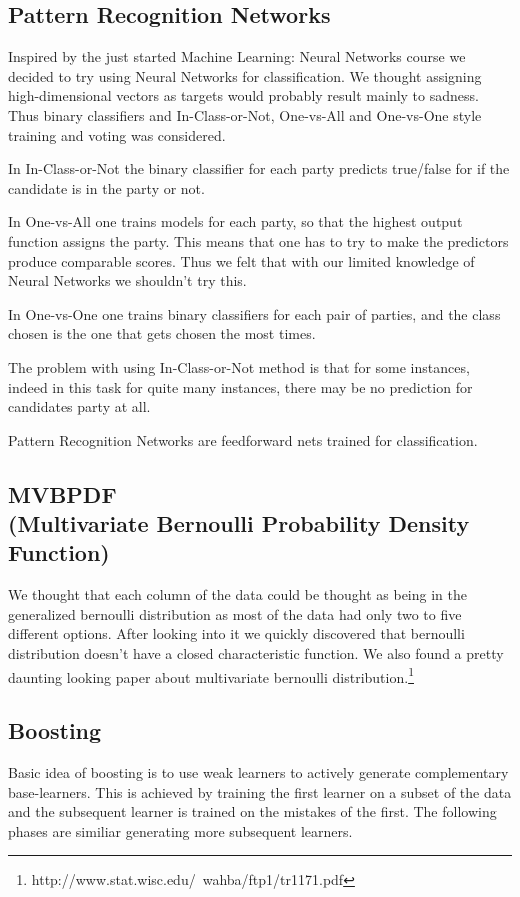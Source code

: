 \documentclass[a4paper,10pt]{article}
\begin{document}
\subsection{Pattern Recognition Networks}
Inspired by the just started Machine Learning: Neural Networks course we decided to try using Neural Networks for classification. We thought assigning high-dimensional vectors as targets would probably result mainly to sadness. Thus binary classifiers and In-Class-or-Not, One-vs-All and One-vs-One style training and voting was considered.


In In-Class-or-Not the binary classifier for each party predicts true/false for if the candidate is in the party or not.

In One-vs-All one trains models for each party, so that the highest output function assigns the party. This means that one has to try to make the predictors produce comparable scores. Thus we felt that with our limited knowledge of Neural Networks we shouldn’t try this.

In One-vs-One one trains binary classifiers for each pair of parties, and the class chosen is the one that gets chosen the most times.


The problem with using In-Class-or-Not method is that for some instances, indeed in this task for quite many instances, there may be no prediction for candidates party at all.

Pattern Recognition Networks are feedforward nets trained for classification.

\subsection{MVBPDF\\ {\small (Multivariate Bernoulli Probability Density Function)}}
We thought that each column of the data could be thought as being in the generalized bernoulli distribution as most of the data had only two to five different options. After looking into it we quickly discovered that bernoulli distribution doesn’t have a closed characteristic function. We also found a pretty daunting looking paper about multivariate bernoulli distribution.\footnote{http://www.stat.wisc.edu/~wahba/ftp1/tr1171.pdf}

\subsection{Boosting}
Basic idea of boosting is to use weak learners to actively generate complementary base-learners. This is achieved by training the first learner on a subset of the data and the subsequent learner is trained on the mistakes of the first. The following phases are similiar generating more subsequent learners.
\end{document}
